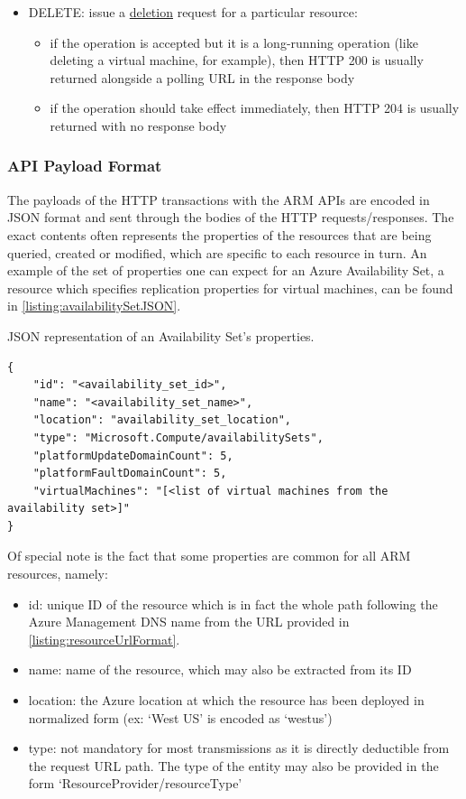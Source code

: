 \documentclass[11pt]{report}
\begin{document}
\begin{itemize}
    \item{DELETE}: issue a \ul{deletion} request for a particular resource:
        \begin{itemize}
            \item{} if the operation is accepted but it is a long-running
                operation (like deleting a virtual machine, for example), then
                HTTP 200 is usually returned alongside a polling URL in the
                response body
            \item{} if the operation should take effect immediately, then HTTP
                204 is usually returned with no response body
        \end{itemize}
\end{itemize}

\subsubsection{API Payload Format}

The payloads of the HTTP transactions with the ARM APIs are encoded in JSON
format and sent through the bodies of the HTTP requests/responses. The exact
contents often represents the properties of the resources that are being
queried, created or modified, which are specific to each resource in turn.
An example of the set of properties one can expect for an Azure
Availability Set, a resource which specifies replication properties for virtual
machines, can be found in \autoref{listing:availabilitySetJSON}.

\begin{listing}[H]
\caption{JSON representation of an Availability Set's properties.}
\label{listing:availabilitySetJSON}
\begin{verbatim}
{
    "id": "<availability_set_id>",
    "name": "<availability_set_name>",
    "location": "availability_set_location",
    "type": "Microsoft.Compute/availabilitySets",
    "platformUpdateDomainCount": 5,
    "platformFaultDomainCount": 5,
    "virtualMachines": "[<list of virtual machines from the availability set>]"
}
\end{verbatim}
\end{listing}

Of special note is the fact that some properties are common for all ARM
resources, namely:

\begin{itemize}
    \item{id}: unique ID of the resource which is in fact the whole path
        following the Azure Management DNS name from the URL provided in
        \autoref{listing:resourceUrlFormat}.
    \item{name}: name of the resource, which may also be extracted from its ID
    \item{location}: the Azure location at which the resource has been
        deployed in normalized form (ex: `West US' is encoded as `westus')
    \item{type}: not mandatory for most transmissions as it is
        directly deductible from the request URL path. The type of the
        entity may also be provided in the form
        `ResourceProvider/resourceType'
\end{itemize}
\end{document}
